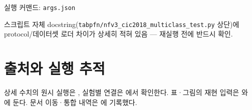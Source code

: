 \par\noindent \textbullet\enspace 실행 커맨드: \texttt{args.\allowbreak{}jso\allowbreak{}n}


\par\noindent \textbullet\enspace 스크립트 자체 docstring(\texttt{tabpfn/\allowbreak{}\allowbreak{}n\allowbreak{}fv3\_\allowbreak{}\allowbreak{}cic2\allowbreak{}018\_\allowbreak{}\allowbreak{}mult\allowbreak{}iclass\_\allowbreak{}\allowbreak{}t\allowbreak{}est.\allowbreak{}py} 상단)에 protocol/\allowbreak{}데이터셋 로더 차이가 상세히 적혀 있음 — 재실행 전에 반드시 확인.




\section*{출처와 실행 추적}

상세 수치의 원시 실행은 , 실험별 연결은 에서 확인한다. 표·그림의 재현 입력은 와 에 둔다. 문서 이동·통합 내역은 에 기록했다.


